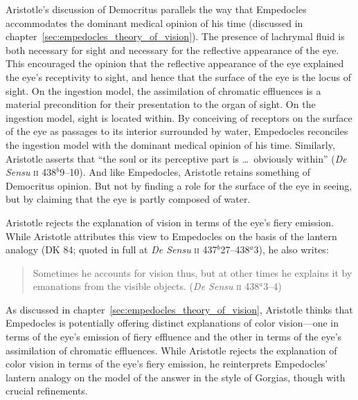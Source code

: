 Aristotle's discussion of Democritus parallels the way that Empedocles accommodates the dominant medical opinion of his time (discussed in chapter~\ref{sec:empedocles_theory_of_vision}). The presence of lachrymal fluid is both necessary for sight and necessary for the reflective appearance of the eye. This encouraged the opinion that the reflective appearance of the eye explained the eye's receptivity to sight, and hence that the surface of the eye is the locus of sight. On the ingestion model, the assimilation of chromatic effluences is a material precondition for their presentation to the organ of sight. On the ingestion model, sight is located within. By conceiving of receptors on the surface of the eye as passages to its interior surrounded by water, Empedocles reconciles the ingestion model with the dominant medical opinion of his time. Similarly, Aristotle asserts that ``the soul or its perceptive part is \ldots\ obviously within'' (\emph{De Sensu} \textsc{ii} 438\( ^{b} \)9--10). And like Empedocles, Aristotle retains something of Democritus opinion. But not by finding a role for the surface of the eye in seeing, but by claiming that the eye is partly composed of water.

Aristotle rejects the explanation of vision in terms of the eye's fiery emission. While Aristotle attributes this view to Empedocles on the basis of the lantern analogy (DK 84; quoted in full at \emph{De Sensu} \textsc{ii} 437\( ^{b} \)27--438\( ^{a} \)3), he also writes:
\begin{quote}
	Sometimes he accounts for vision thus, but at other times he explains it by emanations from the visible objects. (\emph{De Sensu} \textsc{ii} 438\( ^{a} \)3--4)
\end{quote}
As discussed in chapter~\ref{sec:empedocles_theory_of_vision}, Aristotle thinks that Empedocles is potentially offering distinct explanations of color vision---one in terms of the eye's emission of fiery effluence and the other in terms of the eye's assimilation of chromatic effluences. While Aristotle rejects the explanation of color vision in terms of the eye's fiery emission, he reinterprets Empedocles' lantern analogy on the model of the answer in the style of Gorgias, though with crucial refinements.

